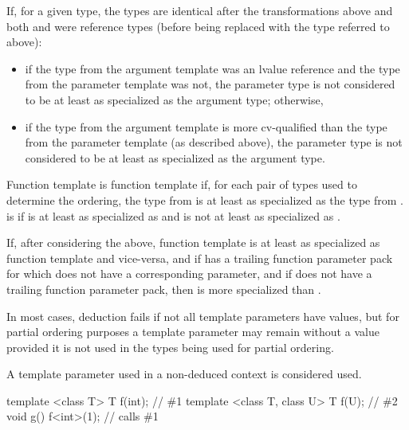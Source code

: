 \pnum
If, for a given type, the
types are identical after the transformations above
and both  and  were reference types (before being replaced with the
type referred to above):

\begin{itemize}
\item if the type from the argument template was an lvalue reference and the type
from the parameter template was not,
the parameter type is not considered to be
at least as specialized as the argument type; otherwise,

\item if the type from
the argument template is more cv-qualified than the type from the
parameter template (as described above),
the parameter type is not considered to be
at least as specialized as the argument type.
\end{itemize}

\pnum
{}%
Function template 
is 
function template  if,
for each pair of types used to determine the ordering,
the type from 
is at least as specialized as
the type from .
is 
 if
is at least as specialized as
 and
is not at least as specialized as
.

\pnum
If, after considering the above, function template 
is at least as specialized as function template  and vice-versa, and
if  has a trailing function parameter pack
for which  does not have a corresponding parameter, and
if  does not have a trailing function parameter pack,
then  is more specialized than .

\pnum
In most cases,
deduction fails if not all template parameters have values,
but for partial ordering purposes a template
parameter may remain without a value provided it is not used in the
types being used for partial ordering.
\begin{note}
A template parameter used in a non-deduced context is considered used.
\end{note}
\begin{example}
\begin{codeblock}
template <class T> T f(int);            // \#1
template <class T, class U> T f(U);     // \#2
void g() {
  f<int>(1);                            // calls \#1
}
\end{codeblock}
\end{example}

